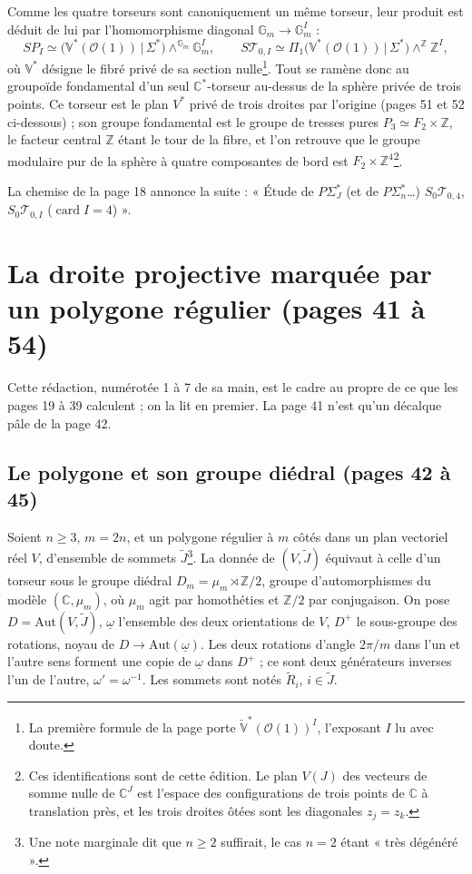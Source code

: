 \documentclass[11pt,a4paper]{article}
\begin{document}
Comme les quatre torseurs sont canoniquement un même torseur, leur produit est
déduit de lui par l'homomorphisme diagonal $\mathbb{G}_m \to
\mathbb{G}_m^I$ :
\[
SP_I \simeq \bigl(\mathbb{V}^{*}(\mathcal{O}(1)) \,\big|\, \Sigma^{*}\bigr)
\wedge^{\mathbb{G}_m} \mathbb{G}_m^I, \qquad
S\mathcal{T}_{0,I} \simeq \Pi_1\bigl(\mathbb{V}^{*}(\mathcal{O}(1)) \,\big|\,
\Sigma^{*}\bigr) \wedge^{\mathbb{Z}} \mathbb{Z}^I,
\]
où $\mathbb{V}^{*}$ désigne le fibré privé de sa section nulle\footnote{La
première formule de la page porte $\check{\mathbb{V}}^{*}(\mathcal{O}(1))^I$,
l'exposant $I$ lu avec doute.}. Tout se ramène donc au groupoïde fondamental
d'un seul $\mathbb{C}^{*}$-torseur au-dessus de la sphère privée de trois
points. Ce torseur est le plan $V^{*}$ privé de trois droites par l'origine
(pages 51 et 52 ci-dessous) ; son groupe fondamental est le groupe de tresses
pures $P_3 \simeq F_2 \times \mathbb{Z}$, le facteur central $\mathbb{Z}$
étant le tour de la fibre, et l'on retrouve que le groupe modulaire pur de la
sphère à quatre composantes de bord est $F_2 \times
\mathbb{Z}^4$\footnote{Ces identifications sont de cette édition. Le plan
$V(J)$ des vecteurs de somme nulle de $\mathbb{C}^J$ est l'espace des
configurations de trois points de $\mathbb{C}$ à translation près, et les
trois droites ôtées sont les diagonales $z_j = z_k$.}.

La chemise de la page 18 annonce la suite : « Étude de $P\Sigma_J^{*}$ (et de
$P\Sigma_n^{*}$\ldots) $S_0\mathcal{T}_{0,4}$, $S_0\mathcal{T}_{0,I}$
($\operatorname{card} I = 4$) ».

\section*{La droite projective marquée par un polygone régulier (pages 41 à
54)}

Cette rédaction, numérotée 1 à 7 de sa main, est le cadre au propre de ce que
les pages 19 à 39 calculent ; on la lit en premier. La page 41 n'est qu'un
décalque pâle de la page 42.

\subsection*{Le polygone et son groupe diédral (pages 42 à 45)}

Soient $n \geq 3$, $m = 2n$, et un polygone régulier à $m$ côtés dans un plan
vectoriel réel $V$, d'ensemble de sommets $\tilde J$\footnote{Une note
marginale dit que $n \geq 2$ suffirait, le cas $n = 2$ étant « très
dégénéré ».}. La donnée de $(V, \tilde J)$ équivaut à celle d'un torseur sous
le groupe diédral $D_m = \mu_m \rtimes \mathbb{Z}/2$, groupe d'automorphismes
du modèle $(\mathbb{C}, \mu_m)$, où $\mu_m$ agit par homothéties et
$\mathbb{Z}/2$ par conjugaison. On pose $D = \mathrm{Aut}(V, \tilde J)$,
$\underline{\omega}$ l'ensemble des deux orientations de $V$, $D^{+}$ le
sous-groupe des rotations, noyau de $D \to \mathrm{Aut}(\underline{\omega})$.
Les deux rotations d'angle $2\pi/m$ dans l'un et l'autre sens forment une
copie de $\underline{\omega}$ dans $D^{+}$ ; ce sont deux générateurs inverses
l'un de l'autre, $\omega' = \omega^{-1}$. Les sommets sont notés
$\widetilde{R}_i$, $i \in \tilde J$.
\end{document}
